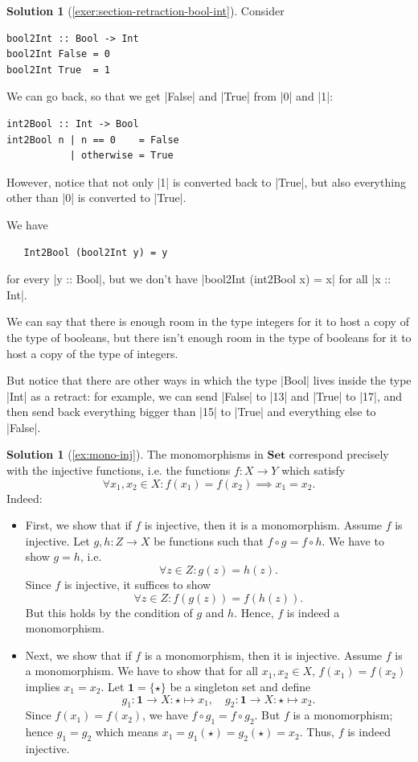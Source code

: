 \documentclass[a4paper,11pt, oneside,titlepage=false]{scrbook}
\theoremstyle{plain}
\theoremstyle{definition}
\newtheorem{solution}[thm]{Solution}
\newcommand{\Catb}[1]{\mathbf{#1}}
\newcommand{\SET}{\Catb{Set}}
\newcommand{\co}[2]{\ensuremath{#2 \circ #1}}
\begin{document}
\begin{solution}[\cref{exer:section-retraction-bool-int}]\label{sol:section-retraction-bool-int}
Consider
\begin{lstlisting}
bool2Int :: Bool -> Int
bool2Int False = 0
bool2Int True  = 1
\end{lstlisting}

We can go back, so that we get |False| and |True| from |0| and |1|:
\begin{lstlisting}
int2Bool :: Int -> Bool
int2Bool n | n == 0    = False
           | otherwise = True
\end{lstlisting}
However, notice that not only |1| is converted back to |True|, but also everything other than |0| is converted to |True|.

We have
\begin{lstlisting}
   Int2Bool (bool2Int y) = y
\end{lstlisting}
for every |y :: Bool|, but we don't have |bool2Int (int2Bool x) = x| for all |x :: Int|.

We can say that there is enough room in the type integers for it to host a copy of the type of booleans, but there isn't enough room in the type of booleans for it to host a copy of the type of integers.

But notice that there are other ways in which the type |Bool| lives inside the type |Int| as a retract: for example, we can send |False| to |13| and |True| to |17|, and then send back everything bigger than |15| to |True| and everything else to |False|.
\end{solution}




\begin{solution}[\cref{ex:mono-inj}]\label{sol:mono-inj}
The monomorphisms in $\SET$ correspond precisely with the injective functions, i.e. the functions $f:X\to Y$ which satisfy
\[
\forall x_1,x_2\in X: f(x_1)=f(x_2) \implies x_1=x_2.
\]
Indeed:
\begin{itemize}
\item First, we show that if $f$ is injective, then it is a monomorphism. Assume $f$ is injective. Let $g,h: Z\to X$ be functions such that $\co{g}{f}=\co{h}{f}$. We have to show $g=h$, i.e.
\[
\forall z\in Z: g(z)=h(z).
\]
Since $f$ is injective, it suffices to show
\[
\forall z\in Z: f(g(z))=f(h(z)).
\]
But this holds by the condition of $g$ and $h$. Hence, $f$ is indeed a monomorphism.
\item Next, we show that if $f$ is a monomorphism, then it is injective. Assume $f$ is a monomorphism. We have to show that for all $x_1,x_2\in X$, $f(x_1) = f(x_2)$ implies $x_1 = x_2$. Let $\mathbf{1} = \{\star\}$ be a singleton set and define
\[
g_1 : \mathbf{1}\to X: \star\mapsto x_1,\quad  g_2 : \mathbf{1}\to X: \star\mapsto x_2.
\]
Since $f(x_1)=f(x_2)$, we have $\co{g_1}{f} = \co{g_2}{f}$. But $f$ is a monomorphism; hence $g_1 = g_2$ which means $x_1 = g_1(\star) = g_2(\star) = x_2$. Thus, $f$ is indeed injective.
\end{itemize}
\end{solution}
\end{document}
